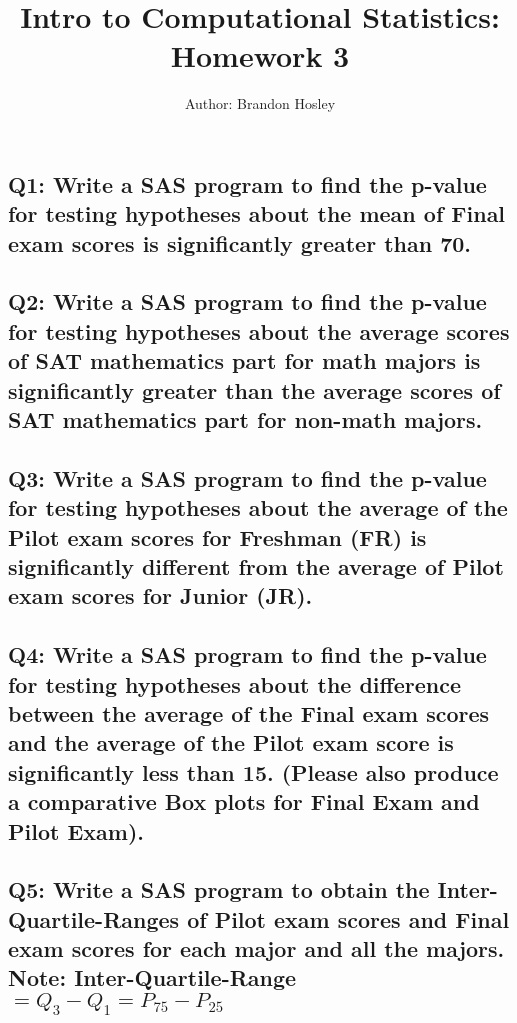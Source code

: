 \documentclass[a4paper,man,natbib]{apa6}
\title{Intro to Computational Statistics: Homework 3}
\author{Author: Brandon Hosley}
\affiliation{Instructor: Liang Kong, Ph.D}
\begin{document}
\maketitle
\singlespacing
	
\subsection*{Q1: Write a SAS program to find the p-value for testing hypotheses about the mean of Final exam scores is significantly greater than 70. }
%

\subsection*{Q2: Write a SAS program to find the p-value for testing hypotheses about the average scores of SAT mathematics part for math majors is significantly greater than the average scores of SAT mathematics part for non-math majors. }


\subsection*{Q3: Write a SAS program to find the p-value for testing hypotheses about the average of the Pilot exam scores for Freshman (FR) is significantly different from the average of Pilot exam scores for Junior (JR). }


\subsection*{Q4: Write a SAS program to find the p-value for testing hypotheses about the difference between the average of the Final exam scores and the average of the Pilot exam score is significantly less than 15.  (Please also produce a comparative Box plots for Final Exam and Pilot Exam). }


\subsection*{Q5: Write a SAS program to obtain the Inter-Quartile-Ranges of Pilot exam scores and Final exam scores for each major and all the majors. \\ Note: Inter-Quartile-Range $=Q_3-Q_1=P_{75}-P_{25}$ }
\end{document}
